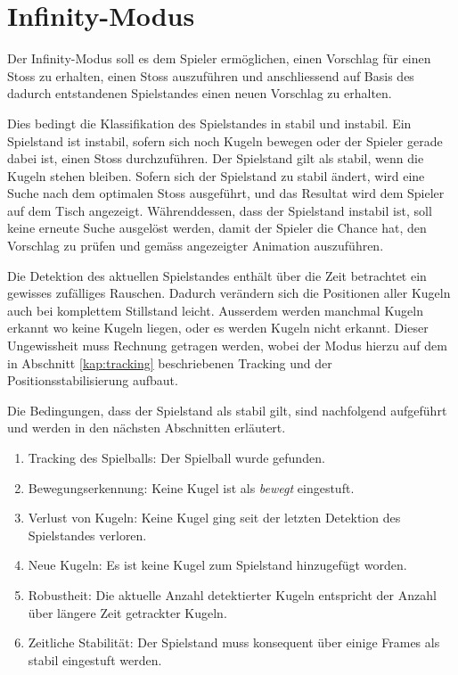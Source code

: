 \section{Infinity-Modus}
Der Infinity-Modus soll es dem Spieler ermöglichen, einen Vorschlag für einen Stoss zu erhalten,
einen Stoss auszuführen und anschliessend auf Basis des dadurch entstandenen Spielstandes einen neuen Vorschlag zu erhalten.

Dies bedingt die Klassifikation des Spielstandes in stabil und instabil.
Ein Spielstand ist instabil, sofern sich noch Kugeln bewegen oder der Spieler gerade dabei ist, einen Stoss durchzuführen.
Der Spielstand gilt als stabil, wenn die Kugeln stehen bleiben.
Sofern sich der Spielstand zu stabil ändert, wird eine Suche nach dem optimalen Stoss ausgeführt,
und das Resultat wird dem Spieler auf dem Tisch angezeigt.
Währenddessen, dass der Spielstand instabil ist, soll keine erneute Suche ausgelöst werden,
damit der Spieler die Chance hat, den Vorschlag zu prüfen und gemäss angezeigter Animation auszuführen.

Die Detektion des aktuellen Spielstandes enthält über die Zeit betrachtet ein gewisses zufälliges Rauschen.
Dadurch verändern sich die Positionen aller Kugeln auch bei komplettem Stillstand leicht.
Ausserdem werden manchmal Kugeln erkannt wo keine Kugeln liegen, oder es werden Kugeln nicht erkannt.
Dieser Ungewissheit muss Rechnung getragen werden, wobei der Modus hierzu auf dem in Abschnitt \ref{kap:tracking}
beschriebenen Tracking und der Positionsstabilisierung aufbaut.

Die Bedingungen, dass der Spielstand als stabil gilt, sind nachfolgend aufgeführt und werden in den nächsten Abschnitten erläutert.
\begin{enumerate}
    \item Tracking des Spielballs: Der Spielball wurde gefunden.
    \item Bewegungserkennung: Keine Kugel ist als \emph{bewegt} eingestuft.
    \item Verlust von Kugeln: Keine Kugel ging seit der letzten Detektion des Spielstandes verloren.
    \item Neue Kugeln: Es ist keine Kugel zum Spielstand hinzugefügt worden.
    \item Robustheit: Die aktuelle Anzahl detektierter Kugeln entspricht der Anzahl über längere Zeit getrackter Kugeln.
    \item Zeitliche Stabilität: Der Spielstand muss konsequent über einige Frames als stabil eingestuft werden.
\end{enumerate}

